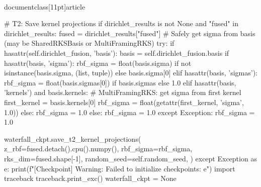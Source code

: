 \\documentclass[11pt]{article}
\begin{document}
\begin{CodeBlock}
                # T2: Save kernel projections
                if dirichlet_results is not None and "fused" in dirichlet_results:
                    fused = dirichlet_results["fused"]
                    # Safely get sigma from basis (may be SharedRKSBasis or MultiFramingRKS)
                    try:
                        if hasattr(self.dirichlet_fusion, 'basis'):
                            basis = self.dirichlet_fusion.basis
                            if hasattr(basis, 'sigma'):
                                rbf_sigma = float(basis.sigma) if not isinstance(basis.sigma, (list, tuple)) else basis.sigma[0]
                            elif hasattr(basis, 'sigmas'):
                                rbf_sigma = float(basis.sigmas[0]) if basis.sigmas else 1.0
                            elif hasattr(basis, 'kernels') and basis.kernels:
                                # MultiFramingRKS: get sigma from first kernel
                                first_kernel = basis.kernels[0]
                                rbf_sigma = float(getattr(first_kernel, 'sigma', 1.0))
                            else:
                                rbf_sigma = 1.0
                        else:
                            rbf_sigma = 1.0
                    except Exception:
                        rbf_sigma = 1.0

                    waterfall_ckpt.save_t2_kernel_projections(
                        z_rbf=fused.detach().cpu().numpy(),
                        rbf_sigma=rbf_sigma,
                        rks_dim=fused.shape[-1],
                        random_seed=self.random_seed,
                    )
            except Exception as e:
                print(f"[Checkpoint] Warning: Failed to initialize checkpoints: {e}")
                import traceback
                traceback.print_exc()
                waterfall_ckpt = None


\end{CodeBlock}
\end{document}
